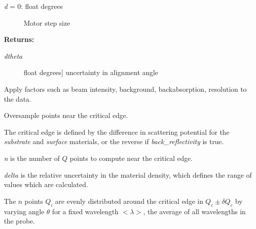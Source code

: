 \documentclass[letterpaper,10pt,english]{sphinxmanual}
\begin{document}
\begin{fulllineitems}
\begin{fulllineitems}
\begin{description}
\item[{\emph{d} = 0: float \textbar{} degrees}] \leavevmode
Motor step size

\end{description}

\textbf{Returns:}
\begin{description}
\item[{\emph{dtheta}}] \leavevmode{[}float \textbar{} degrees{]}
uncertainty in alignment angle

\end{description}

\end{fulllineitems}


\begin{fulllineitems}
\label{api/probe:refl1d.probe.QProbe.apply_beam}
Apply factors such as beam intensity, background, backabsorption,
resolution to the data.

\end{fulllineitems}


\begin{fulllineitems}
\label{api/probe:refl1d.probe.QProbe.calc_Q}
\end{fulllineitems}


\begin{fulllineitems}
\label{api/probe:refl1d.probe.QProbe.critical_edge}
Oversample points near the critical edge.

The critical edge is defined by the difference in scattering
potential for the \emph{substrate} and \emph{surface} materials, or the
reverse if \emph{back\_reflectivity} is true.

\emph{n} is the number of $Q$ points to compute near the critical edge.

\emph{delta} is the relative uncertainty in the material density,
which defines the range of values which are calculated.

The $n$ points $Q_i$ are evenly distributed around the critical
edge in $Q_c \pm \delta Q_c$ by varying angle $\theta$ for a
fixed wavelength $< \lambda >$, the average of all wavelengths
in the probe.


\end{fulllineitems}
\end{fulllineitems}
\end{document}
